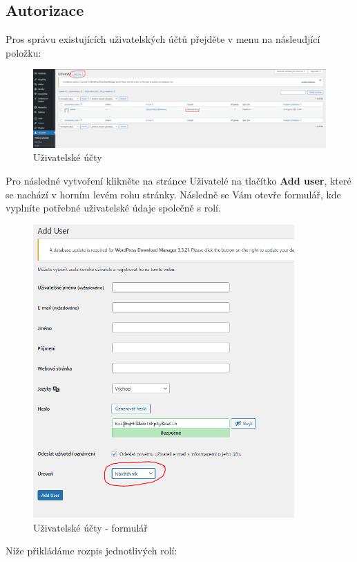\documentclass[12pt,a4paper]{article}
\begin{document}
	
	
	\subsection{Autorizace}
	Pros správu existujících uživatelských účtů přejděte v menu na násleudjící položku:
	
		
	\begin{figure}[htp]
		\centering
		\includegraphics[width=15cm]{WPuzivatele.png}
		\caption{Uživatelské účty}
		\label{fig:role}
	\end{figure}
	
	
	Pro následné vytvoření klikněte na stránce Uživatelé na tlačítko \textbf{Add user}, které se nachází v horním levém rohu stránky. Následně se Vám otevře formulář, kde vyplníte potřebné uživatelské údaje společně s rolí.
	
	\begin{figure}[htp]
		\centering
		\includegraphics[width=10cm]{WPcreateuser.png}
		\caption{Uživatelské účty - formulář}
		\label{fig:role}
	\end{figure}
	
	\newpage
	Níže přikládáme rozpis jednotlivých rolí:	
	
\end{document}
